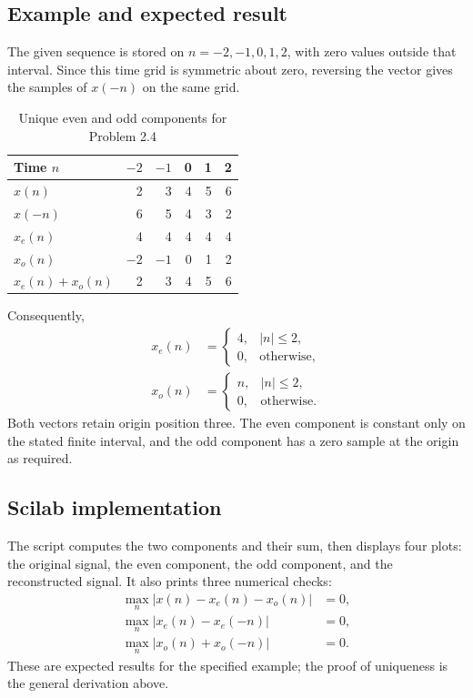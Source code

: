 \subsection{Example and expected result}
The given sequence is stored on $n=-2,-1,0,1,2$, with zero values
outside that interval. Since this time grid is symmetric about zero,
reversing the vector gives the samples of $x(-n)$ on the same grid.
\begin{table}[H]
  \centering
  \caption{Unique even and odd components for Problem 2.4}
  \label{tab:p24}
  \begin{tabular}{lrrrrr}
    \toprule
    Time $n$ & $-2$ & $-1$ & 0 & 1 & 2\\
    \midrule
    $x(n)$ & 2 & 3 & 4 & 5 & 6\\
    $x(-n)$ & 6 & 5 & 4 & 3 & 2\\
    $x_e(n)$ & 4 & 4 & 4 & 4 & 4\\
    $x_o(n)$ & $-2$ & $-1$ & 0 & 1 & 2\\
    $x_e(n)+x_o(n)$ & 2 & 3 & 4 & 5 & 6\\
    \bottomrule
  \end{tabular}
\end{table}
Consequently,
\begin{align}
  x_e(n)&=\begin{cases}4,& |n|\leq2,\\0,&\text{otherwise},\end{cases}\\
  x_o(n)&=\begin{cases}n,& |n|\leq2,\\0,&\text{otherwise}.\end{cases}
\end{align}
Both vectors retain origin position three. The even component is
constant only on the stated finite interval, and the odd component
has a zero sample at the origin as required.

\subsection{Scilab implementation}
The script computes the two components and their sum, then displays
four plots: the original signal, the even component, the odd component,
and the reconstructed signal. It also prints three numerical checks:
\begin{align}
  \max_n|x(n)-x_e(n)-x_o(n)|&=0,\\
  \max_n|x_e(n)-x_e(-n)|&=0,\\
  \max_n|x_o(n)+x_o(-n)|&=0.
\end{align}
These are expected results for the specified example; the proof of
uniqueness is the general derivation above.


